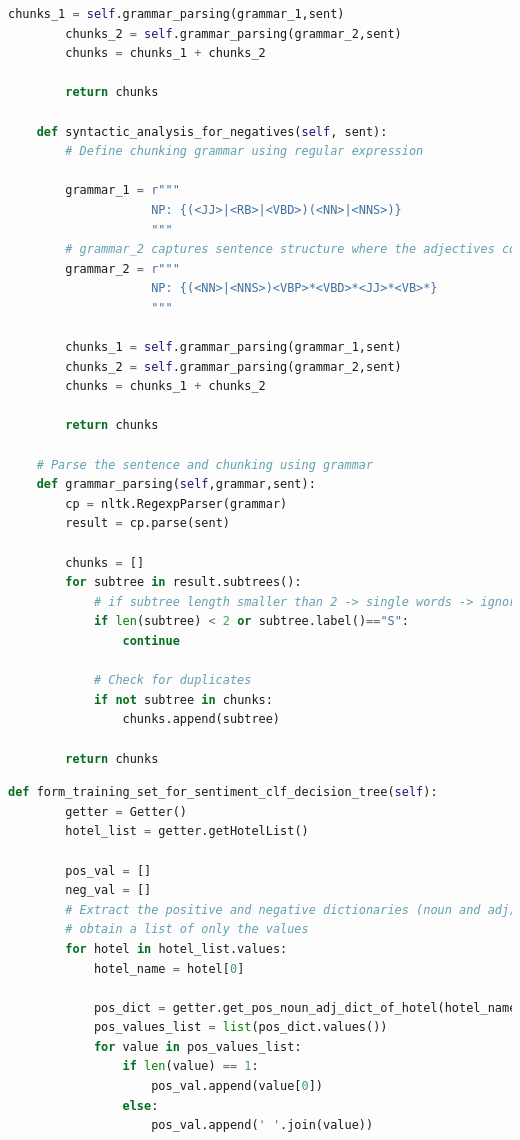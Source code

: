 \documentclass[a4paper]{report}
\begin{document}
{{\begin{lstlisting}[language=Python,label={lst:grammar_chunking},caption={Grammars used for chunking in reviews in Syntactic Analysis.} ]
        chunks_1 = self.grammar_parsing(grammar_1,sent)
        chunks_2 = self.grammar_parsing(grammar_2,sent)
        chunks = chunks_1 + chunks_2

        return chunks
    
    def syntactic_analysis_for_negatives(self, sent):
        # Define chunking grammar using regular expression
        
        grammar_1 = r"""
                    NP: {(<JJ>|<RB>|<VBD>)(<NN>|<NNS>)}
                    """
        # grammar_2 captures sentence structure where the adjectives comes after the nouns
        grammar_2 = r"""
                    NP: {(<NN>|<NNS>)<VBP>*<VBD>*<JJ>*<VB>*}
                    """
        
        chunks_1 = self.grammar_parsing(grammar_1,sent)
        chunks_2 = self.grammar_parsing(grammar_2,sent)
        chunks = chunks_1 + chunks_2

        return chunks
    
    # Parse the sentence and chunking using grammar
    def grammar_parsing(self,grammar,sent):
        cp = nltk.RegexpParser(grammar)
        result = cp.parse(sent)

        chunks = []
        for subtree in result.subtrees():
            # if subtree length smaller than 2 -> single words -> ignore
            if len(subtree) < 2 or subtree.label()=="S":
                continue

            # Check for duplicates
            if not subtree in chunks:
                chunks.append(subtree)

        return chunks
\end{lstlisting}

\begin{lstlisting}[language=Python,label={lst:tfidf},caption={Document term matrix using TF-IDF.} ]
    def form_training_set_for_sentiment_clf_decision_tree(self):
        getter = Getter()
        hotel_list = getter.getHotelList()

        pos_val = []
        neg_val = []
        # Extract the positive and negative dictionaries (noun and adj) from each hotel
        # obtain a list of only the values
        for hotel in hotel_list.values:
            hotel_name = hotel[0]

            pos_dict = getter.get_pos_noun_adj_dict_of_hotel(hotel_name)
            pos_values_list = list(pos_dict.values())
            for value in pos_values_list:
                if len(value) == 1:
                    pos_val.append(value[0])
                else:
                    pos_val.append(' '.join(value))



\end{lstlisting}}}
\end{document}
